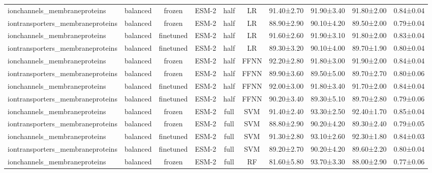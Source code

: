 \begin{tabular}{lcccccc}
    ionchannels\_membraneproteins &   balanced &         frozen &        ESM-2 &      half &         LR &  91.40±2.70 &  91.90±3.40 &  91.80±2.00 & 0.84±0.04 \\
iontransporters\_membraneproteins &   balanced &         frozen &        ESM-2 &      half &         LR &  88.90±2.90 &  90.10±4.20 &  89.50±2.00 & 0.79±0.04 \\
    ionchannels\_membraneproteins &   balanced &      finetuned &        ESM-2 &      half &         LR &  91.60±2.60 &  91.90±3.10 &  91.80±2.00 & 0.83±0.04 \\
iontransporters\_membraneproteins &   balanced &      finetuned &        ESM-2 &      half &         LR &  89.30±3.20 &  90.10±4.00 &  89.70±1.90 & 0.80±0.04 \\
    ionchannels\_membraneproteins &   balanced &         frozen &        ESM-2 &      half &       FFNN &  92.20±2.80 &  91.80±3.00 &  91.90±2.00 & 0.84±0.04 \\
iontransporters\_membraneproteins &   balanced &         frozen &        ESM-2 &      half &       FFNN &  89.90±3.60 &  89.50±5.00 &  89.70±2.70 & 0.80±0.06 \\
    ionchannels\_membraneproteins &   balanced &      finetuned &        ESM-2 &      half &       FFNN &  92.00±3.00 &  91.80±3.40 &  91.70±2.00 & 0.84±0.04 \\
iontransporters\_membraneproteins &   balanced &      finetuned &        ESM-2 &      half &       FFNN &  90.20±3.40 &  89.30±5.10 &  89.70±2.80 & 0.79±0.06 \\
    ionchannels\_membraneproteins &   balanced &         frozen &        ESM-2 &      full &        SVM &  91.40±2.40 &  93.30±2.50 &  92.40±1.70 & 0.85±0.04 \\
iontransporters\_membraneproteins &   balanced &         frozen &        ESM-2 &      full &        SVM &  88.80±2.90 &  90.20±4.20 &  89.30±2.40 & 0.79±0.05 \\
    ionchannels\_membraneproteins &   balanced &      finetuned &        ESM-2 &      full &        SVM &  91.30±2.80 &  93.10±2.60 &  92.30±1.80 & 0.84±0.03 \\
iontransporters\_membraneproteins &   balanced &      finetuned &        ESM-2 &      full &        SVM &  89.20±2.70 &  90.20±4.20 &  89.60±2.20 & 0.80±0.04 \\
    ionchannels\_membraneproteins &   balanced &         frozen &        ESM-2 &      full &         RF &  81.60±5.80 &  93.70±3.30 &  88.00±2.90 & 0.77±0.06 \\

\end{tabular}
